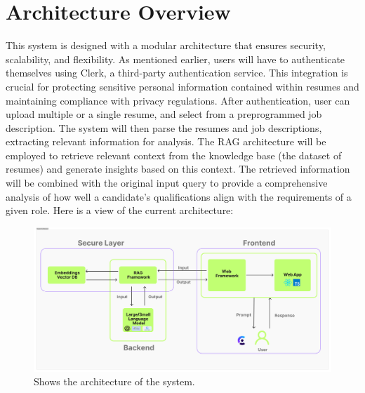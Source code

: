 \documentclass[12pt]{report}
\begin{document}
\section{Architecture Overview}
This system is designed with a modular architecture that ensures security, scalability, and flexibility. As mentioned earlier, users will have to authenticate themselves using Clerk, a third-party authentication service. This integration is crucial for protecting sensitive personal information contained within resumes and maintaining compliance with privacy regulations. After authentication, user can  upload multiple or a single resume, and select from a preprogrammed job description. The system will then parse the resumes and job descriptions, extracting relevant information for analysis. The RAG architecture will be employed to retrieve relevant context from the knowledge base (the dataset of resumes) and generate insights based on this context. The retrieved information will be combined with the original input query to provide a comprehensive analysis of how well a candidate's qualifications align with the requirements of a given role. Here is a view of the current architecture:

\begin{figure}[h]
    \centering
    \includegraphics[width=1\textwidth]{images/System_Arch.png}
    \caption{Shows the architecture of the system.}
    \label{fig:architecture_diagram}
\end{figure}
\end{document}
